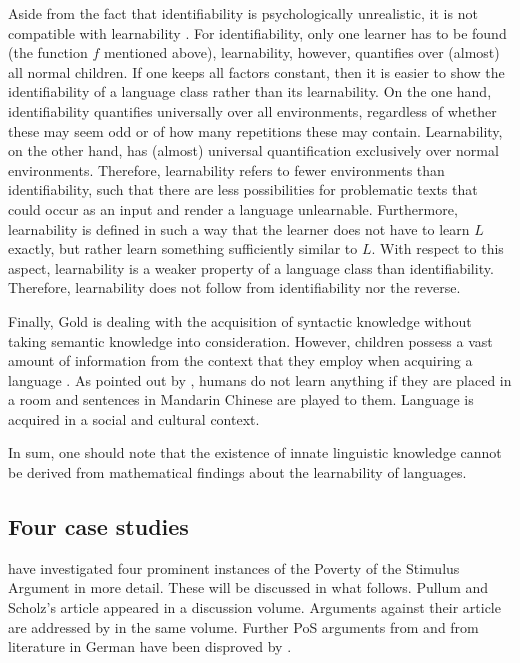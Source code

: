 Aside from the fact that identifiability is psychologically unrealistic, it is not compatible with learnability \citep[]{Johnson2004a}.
For identifiability, only one learner has to be found (the function $f$ mentioned above), learnability, however, quantifies over
(almost) all normal children. If one keeps all factors constant, then it is easier to show the identifiability of a language class rather than
its learnability.
On the one hand, identifiability quantifies universally over all environments, regardless of whether these may seem odd or of how many repetitions these may contain.
Learnability, on the other hand, has (almost) universal quantification exclusively over normal environments. Therefore, learnability refers to fewer environments
than identifiability, such that there are less possibilities for problematic texts that could occur as an input and render a language unlearnable.
Furthermore, learnability is defined in such a way that the learner does not have to learn $L$ exactly, but rather learn something sufficiently similar
to $L$. With respect to this aspect, learnability is a weaker property of a language class than
identifiability. Therefore, learnability does not follow from identifiability nor the reverse.
  
Finally, Gold is dealing with the acquisition of syntactic knowledge without taking semantic knowledge into consideration.  
However, children possess a vast amount of information from the context that they employ when acquiring a language \citep{TCCBM2005a}.
As pointed out by \citet[]{Klein86a-u}, humans do not learn anything if they are placed in a room and sentences in
Mandarin Chinese are played to them. Language is acquired in a social and cultural context.
  
In sum, one should note that the existence of innate linguistic knowledge cannot be derived from mathematical
findings about the learnability of languages.  

\subsection{Four case studies}
\label{PSA-cases}

\mbox{}\citet{PS2002a} have investigated four prominent instances of the Poverty of the Stimulus Argument in more detail.
These will be discussed in what follows. Pullum and Scholz's article appeared in a discussion volume. Arguments against their
article are addressed by \citet{SP2002b} in the same volume. Further PoS arguments from \citet{Chomsky86} and
from literature in German have been disproved by \citet{Eisenberg92b}.

